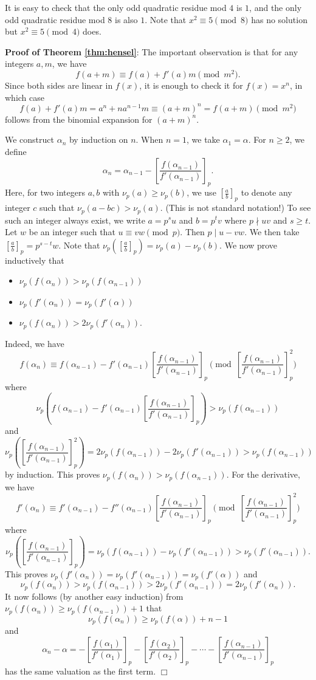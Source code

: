 \documentclass{article}
\begin{document}
It is easy to check that the only odd quadratic residue mod $4$ is $1$, and the only odd quadratic residue mod $8$ is also $1$. Note that $x^2 \equiv 5\pmod{8}$ has no solution but $x^2 \equiv 5\pmod{4}$ does.

\vspace{5pt}
\noindent\textbf{Proof of Theorem \ref{thm:hensel}}: The important observation is that for any integers $a,m$, we have
$$f(a + m) \equiv f(a) + f'(a)m\pmod{m^2}.$$
Since both sides are linear in $f(x)$, it is enough to check it for $f(x) = x^n$, in which case $$f(a) + f'(a)m = a^n + na^{n-1}m\equiv (a+m)^n = f(a+m)\pmod{m^2}$$ follows from the binomial expansion for $(a+m)^n$.

We construct $\alpha_n$ by induction on $n$. When $n = 1$, we take $\alpha_1 = \alpha$. For $n\geq 2$, we define $$\alpha_n = \alpha_{n-1} - \left[\frac{f(\alpha_{n-1})}{f'(\alpha_{n-1})}\right]_p.$$
Here, for two integers $a,b$ with $\nu_p(a)\geq\nu_p(b)$, we use $[\frac{a}{b}]_p$ to denote any integer $c$ such that $\nu_p(a - bc) > \nu_p(a).$ (This is not standard notation!) To see such an integer always exist, we write $a = p^su$ and $b = p^tv$ where $p\nmid uv$ and $s\geq t$. Let $w$ be an integer such that $u\equiv vw\pmod{p}$. Then $p\mid u - vw.$ We then take $[\frac{a}{b}]_p = p^{s-t}w$.  Note that $\nu_p([\frac{a}{b}]_p) = \nu_p(a) - \nu_p(b)$. We now prove inductively that
\begin{itemize}
    \item $\nu_p(f(\alpha_n)) > \nu_p(f(\alpha_{n-1}))$
    \item $\nu_p(f'(\alpha_n)) = \nu_p(f'(\alpha))$
    \item $\nu_p(f(\alpha_n))>2\nu_p(f'(\alpha_n))$.
\end{itemize}
Indeed, we have
$$f(\alpha_n) \equiv f(\alpha_{n-1}) - f'(\alpha_{n-1})\left[\frac{f(\alpha_{n-1})}{f'(\alpha_{n-1})}\right]_p\pmod{\left[\frac{f(\alpha_{n-1})}{f'(\alpha_{n-1})}\right]_p^2}$$
where
$$\nu_p\left(f(\alpha_{n-1}) - f'(\alpha_{n-1})\left[\frac{f(\alpha_{n-1})}{f'(\alpha_{n-1})}\right]_p\right) > \nu_p(f(\alpha_{n-1}))$$
and
$$\nu_p\left(\left[\frac{f(\alpha_{n-1})}{f'(\alpha_{n-1})}\right]_p^2\right) = 2\nu_p(f(\alpha_{n-1})) - 2\nu_p(f'(\alpha_{n-1})) > \nu_p(f(\alpha_{n-1}))$$
by induction. This proves $\nu_p(f(\alpha_n)) > \nu_p(f(\alpha_{n-1})).$ For the derivative, we have
$$f'(\alpha_n) \equiv f'(\alpha_{n-1}) - f''(\alpha_{n-1})\left[\frac{f(\alpha_{n-1})}{f'(\alpha_{n-1})}\right]_p\pmod{\left[\frac{f(\alpha_{n-1})}{f'(\alpha_{n-1})}\right]_p^2}$$
where $$\nu_p\left(\left[\frac{f(\alpha_{n-1})}{f'(\alpha_{n-1})}\right]_p\right) = \nu_p(f(\alpha_{n-1})) - \nu_p(f'(\alpha_{n-1})) > \nu_p(f'(\alpha_{n-1})).$$
This proves $\nu_p(f'(\alpha_n)) = \nu_p(f'(\alpha_{n-1})) = \nu_p(f'(\alpha))$ and
$$\nu_p(f(\alpha_n)) > \nu_p(f(\alpha_{n-1})) > 2\nu_p(f'(\alpha_{n-1})) = 2\nu_p(f'(\alpha_n)).$$
It now follows (by another easy induction) from $\nu_p(f(\alpha_n))\geq\nu_p(f(\alpha_{n-1}))+1$ that $$\nu_p(f(\alpha_n))\geq\nu_p(f(\alpha)) + n-1$$
and
$$\alpha_n - \alpha = -\left[\frac{f(\alpha_1)}{f'(\alpha_1)}\right]_p-\left[\frac{f(\alpha_{2})}{f'(\alpha_{2})}\right]_p-\cdots-\left[\frac{f(\alpha_{n-1})}{f'(\alpha_{n-1})}\right]_p$$
has the same valuation as the first term.  $\Box$
\end{document}
